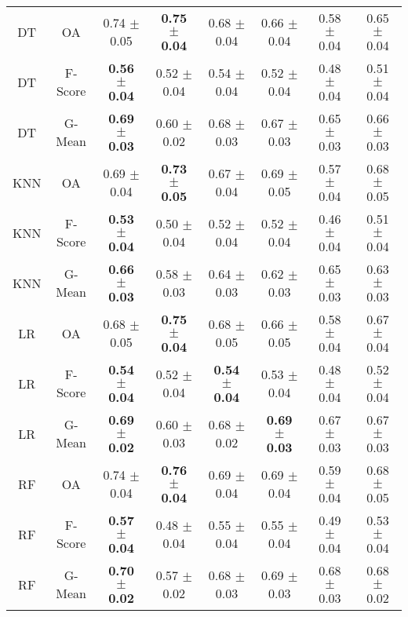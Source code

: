 \begin{longtable}{cccccccc}
\bottomrule
\endlastfoot
        DT &      OA &          0.74 $\pm$ 0.05 & \textbf{0.75 $\pm$ 0.04} &          0.68 $\pm$ 0.04 &          0.66 $\pm$ 0.04 & 0.58 $\pm$ 0.04 & 0.65 $\pm$ 0.04 \\
        DT & F-Score & \textbf{0.56 $\pm$ 0.04} &          0.52 $\pm$ 0.04 &          0.54 $\pm$ 0.04 &          0.52 $\pm$ 0.04 & 0.48 $\pm$ 0.04 & 0.51 $\pm$ 0.04 \\
        DT &  G-Mean & \textbf{0.69 $\pm$ 0.03} &          0.60 $\pm$ 0.02 &          0.68 $\pm$ 0.03 &          0.67 $\pm$ 0.03 & 0.65 $\pm$ 0.03 & 0.66 $\pm$ 0.03 \\
       KNN &      OA &          0.69 $\pm$ 0.04 & \textbf{0.73 $\pm$ 0.05} &          0.67 $\pm$ 0.04 &          0.69 $\pm$ 0.05 & 0.57 $\pm$ 0.04 & 0.68 $\pm$ 0.05 \\
       KNN & F-Score & \textbf{0.53 $\pm$ 0.04} &          0.50 $\pm$ 0.04 &          0.52 $\pm$ 0.04 &          0.52 $\pm$ 0.04 & 0.46 $\pm$ 0.04 & 0.51 $\pm$ 0.04 \\
       KNN &  G-Mean & \textbf{0.66 $\pm$ 0.03} &          0.58 $\pm$ 0.03 &          0.64 $\pm$ 0.03 &          0.62 $\pm$ 0.03 & 0.65 $\pm$ 0.03 & 0.63 $\pm$ 0.03 \\
        LR &      OA &          0.68 $\pm$ 0.05 & \textbf{0.75 $\pm$ 0.04} &          0.68 $\pm$ 0.05 &          0.66 $\pm$ 0.05 & 0.58 $\pm$ 0.04 & 0.67 $\pm$ 0.04 \\
        LR & F-Score & \textbf{0.54 $\pm$ 0.04} &          0.52 $\pm$ 0.04 & \textbf{0.54 $\pm$ 0.04} &          0.53 $\pm$ 0.04 & 0.48 $\pm$ 0.04 & 0.52 $\pm$ 0.04 \\
        LR &  G-Mean & \textbf{0.69 $\pm$ 0.02} &          0.60 $\pm$ 0.03 &          0.68 $\pm$ 0.02 & \textbf{0.69 $\pm$ 0.03} & 0.67 $\pm$ 0.03 & 0.67 $\pm$ 0.03 \\
        RF &      OA &          0.74 $\pm$ 0.04 & \textbf{0.76 $\pm$ 0.04} &          0.69 $\pm$ 0.04 &          0.69 $\pm$ 0.04 & 0.59 $\pm$ 0.04 & 0.68 $\pm$ 0.05 \\
        RF & F-Score & \textbf{0.57 $\pm$ 0.04} &          0.48 $\pm$ 0.04 &          0.55 $\pm$ 0.04 &          0.55 $\pm$ 0.04 & 0.49 $\pm$ 0.04 & 0.53 $\pm$ 0.04 \\
        RF &  G-Mean & \textbf{0.70 $\pm$ 0.02} &          0.57 $\pm$ 0.02 &          0.68 $\pm$ 0.03 &          0.69 $\pm$ 0.03 & 0.68 $\pm$ 0.03 & 0.68 $\pm$ 0.02 \\
\end{longtable}
